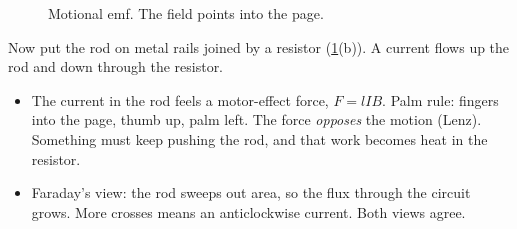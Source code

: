 \begin{figure}
  \caption{Motional emf. The field points into the page.}\label{ch3:fig:rod}
\end{figure}

Now put the rod on metal rails joined by a resistor (\cref{ch3:fig:rod}(b)). A
current flows up the rod and down through the resistor.
\begin{itemize}
  \item The current in the rod feels a motor-effect force, $F = lIB$. Palm rule:
        fingers into the page, thumb up, palm left. The force \emph{opposes} the
        motion (Lenz). Something must keep pushing the rod, and that work becomes
        heat in the resistor.
  \item Faraday's view: the rod sweeps out area, so the flux through the circuit
        grows. More crosses means an anticlockwise current. Both views agree.
\end{itemize}

